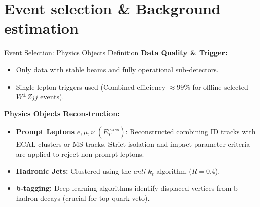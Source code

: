 \section{Event selection \& Background estimation}
\begin{frame}{Event Selection: Physics Objects Definition}
    \textbf{Data Quality \& Trigger:}
    \begin{itemize}
        \item Only data with stable beams and fully operational sub-detectors.
        \item Single-lepton triggers used (Combined efficiency $\approx 99\%$ for offline-selected $W^\pm Zjj$ events).
    \end{itemize}
    \vspace{0.3cm}
    \textbf{Physics Objects Reconstruction:}
    \begin{itemize}
        \item \textbf{Prompt Leptons} $e, \mu, \nu$ $(E_T^{miss})$: Reconstructed combining ID tracks with ECAL clusters or MS tracks. Strict isolation and impact parameter criteria are applied to reject non-prompt leptons.
        \item \textbf{Hadronic Jets:} Clustered using the \textit{anti-$k_t$} algorithm ($R=0.4$). 
        \item \textbf{b-tagging:} Deep-learning algorithms identify displaced vertices from b-hadron decays (crucial for top-quark veto).
    \end{itemize}
\end{frame}

